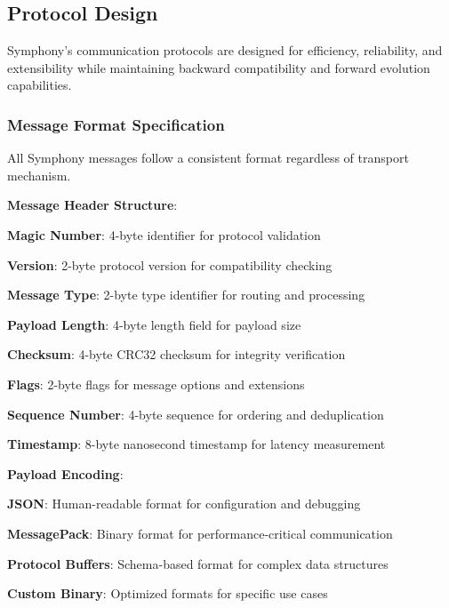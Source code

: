 \subsection*{Protocol Design}

Symphony's communication protocols are designed for efficiency, reliability, and extensibility while maintaining backward compatibility and forward evolution capabilities.

\subsubsection*{Message Format Specification}

All Symphony messages follow a consistent format regardless of transport mechanism.

\textbf{Message Header Structure}:
\begin{compactlist}
    \item \textbf{Magic Number}: 4-byte identifier for protocol validation
    \item \textbf{Version}: 2-byte protocol version for compatibility checking
    \item \textbf{Message Type}: 2-byte type identifier for routing and processing
    \item \textbf{Payload Length}: 4-byte length field for payload size
    \item \textbf{Checksum}: 4-byte CRC32 checksum for integrity verification
    \item \textbf{Flags}: 2-byte flags for message options and extensions
    \item \textbf{Sequence Number}: 4-byte sequence for ordering and deduplication
    \item \textbf{Timestamp}: 8-byte nanosecond timestamp for latency measurement
\end{compactlist}

\textbf{Payload Encoding}:
\begin{compactlist}
    \item \textbf{JSON}: Human-readable format for configuration and debugging
    \item \textbf{MessagePack}: Binary format for performance-critical communication
    \item \textbf{Protocol Buffers}: Schema-based format for complex data structures
    \item \textbf{Custom Binary}: Optimized formats for specific use cases
\end{compactlist}

